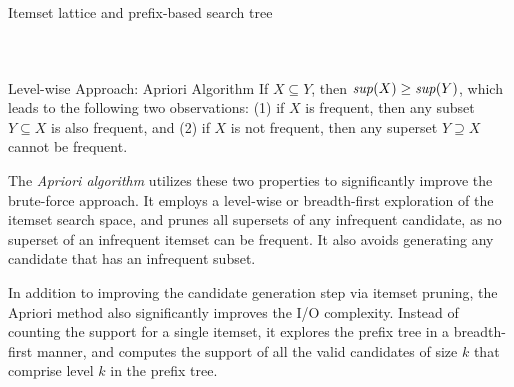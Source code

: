 \begin{frame}{Itemset lattice and pref\/{i}x-based search tree}
\begin{columns}
{{   %
  \endpsmatrix
  }}%
\end{columns}
\end{frame}


\begin{frame}{Level-wise Approach: Apriori Algorithm}
If $X \subseteq Y$, then
$\mathit{sup}(X) \geq \mathit{sup}(Y)$, which leads to the following two observations:
(1) if $X$ is frequent, then any subset $Y \subseteq X$ is also frequent,
and (2) if $X$ is not frequent, then any superset $Y \supseteq X$ cannot
be frequent. 

\medskip
The {\em Apriori algorithm} utilizes these two properties
to signif\/{i}cantly improve the brute-force approach.  It employs a
level-wise or breadth-f\/{i}rst exploration of the itemset search space, and
prunes all supersets of any infrequent candidate, as no superset of
an infrequent itemset can be frequent. It also avoids generating any
candidate that has an infrequent subset.

\medskip
In addition to improving the candidate generation step via itemset
pruning, the Apriori method also signif\/{i}cantly improves the I/O
complexity. Instead of counting the support for a single itemset, it
explores the pref\/{i}x tree in a breadth-f\/{i}rst manner, and computes the
support of all the valid candidates of size $k$ that comprise level $k$ in the
pref\/{i}x tree.
\end{frame}



